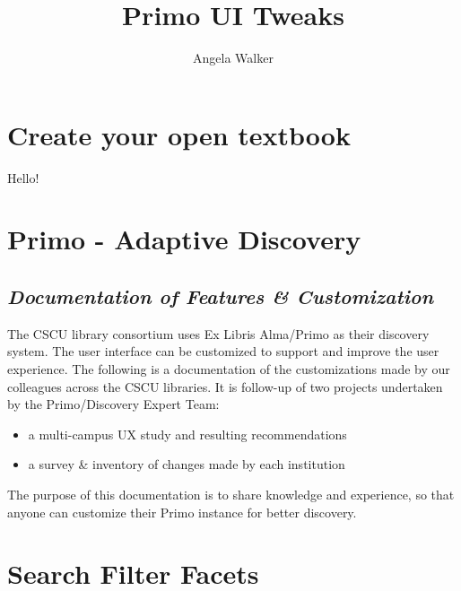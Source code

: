 \documentclass[
  openany]{book}
\title{Primo UI Tweaks}
\author{Angela Walker}
\date{}
\providecommand{\tightlist}{%
  \setlength{\itemsep}{0pt}\setlength{\parskip}{0pt}}
\begin{document}
\maketitle

{
\setcounter{tocdepth}{1}
\tableofcontents
}
\hypertarget{create-your-open-textbook}{%
\chapter{Create your open textbook}\label{create-your-open-textbook}}

Hello!

\hypertarget{primo---adaptive-discovery}{%
\chapter{Primo - Adaptive Discovery}\label{primo---adaptive-discovery}}

\hypertarget{documentation-of-features-customization}{%
\section{\texorpdfstring{\emph{Documentation of Features \& Customization}}{Documentation of Features \& Customization}}\label{documentation-of-features-customization}}

The CSCU library consortium uses Ex Libris Alma/Primo as their discovery system. The user interface can be customized to support and improve the user experience.
The following is a documentation of the customizations made by our colleagues across the CSCU libraries. It is follow-up of two projects undertaken by the Primo/Discovery Expert Team:

\begin{itemize}
\tightlist
\item
  a multi-campus UX study and resulting recommendations
\item
  a survey \& inventory of changes made by each institution
\end{itemize}

The purpose of this documentation is to share knowledge and experience, so that anyone can customize their Primo instance for better discovery.

\hypertarget{search-filter-facets}{%
\chapter{Search Filter Facets}\label{search-filter-facets}}
\end{document}
